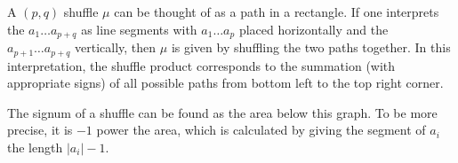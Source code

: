 \begin{rem}
A $(p,q)$ shuffle $\mu$ can be thought of as a path in a rectangle. 
If one interprets the $a_1 \ldots a_{p+q}$ as line segments with $a_1 \ldots a_p$ placed horizontally and the $a_{p+1}\ldots a_{p+q}$ vertically, then $\mu$ is given by shuffling the two paths together. 
In this interpretation, the shuffle product corresponds to the summation (with appropriate signs) of all possible paths from bottom left to the top right corner.
\begin{center}
\end{center}
The signum of a shuffle can be found as the area below this graph. To be more precise, it is $-1$ power the area, which is calculated by giving the segment of $a_i$ the length $|a_i|-1$. 
\end{rem}


